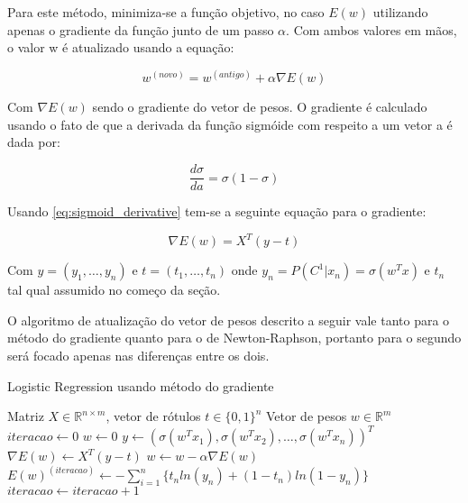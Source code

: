 Para este método, minimiza-se a função objetivo, no caso $E(w)$ utilizando apenas o gradiente
da função junto de um passo $\alpha$. Com ambos valores em mãos, o valor w é atualizado usando
a equação:

\begin{center}
	\begin{equation}
		w^{ ( novo )} = w^{ (antigo) }  + \alpha \nabla E(w)
	\end{equation}
\end{center}

Com $\nabla E(w)$ sendo o gradiente do vetor de pesos. O gradiente é calculado usando o fato de que
a derivada da função sigmóide com respeito a um vetor a é dada por:

\begin{center}
	\begin{equation}
	\label{eq:sigmoid_derivative}
		\frac{d \sigma}{d a} = \sigma (1 - \sigma )
	\end{equation}
\end{center}

Usando \ref{eq:sigmoid_derivative} tem-se a seguinte equação para o gradiente:

\begin{center}
	\begin{equation}\label{eq:gradient}
		\nabla E(w) = X^T(y - t)
	\end{equation}
\end{center}

Com $y = (y_1, \ldots, y_n)$ e $t = (t_1, \ldots, t_n)$ onde
$y_n = P(C^1 | x_n) = \sigma(w^Tx)$ e $t_n$ tal qual assumido no começo da seção.

O algoritmo de atualização do vetor de pesos descrito a seguir vale tanto para o método
do gradiente quanto para o de Newton-Raphson, portanto para o segundo será focado apenas nas
diferenças entre os dois.


\begin{algorithm}[H]
	\caption{Logistic Regression usando método do gradiente}
	\begin{algorithmic}[1]
		\REQUIRE Matriz $ X \in \mathbb{R}^{n \times m} $, 
		vetor de rótulos $t \in \{0, 1\}^n$
		\ENSURE Vetor de pesos $w \in \mathbb{R}^m$
		\STATE $iteracao \leftarrow 0$
		\STATE $w \leftarrow 0$
		 \label{lst:line:condition}
			\STATE $y \leftarrow (\sigma(w^Tx_1), \sigma(w^Tx_2), \ldots, \sigma(w^Tx_n))^T$ 
			\STATE $\nabla E(w) \leftarrow X^T(y - t)$ 
			\STATE $w \leftarrow w - \alpha \nabla E(w)$ 
			\STATE $E(w)^{ (iteracao) } \leftarrow 
			- \sum_{i = 1}^{n} \{ t_nln(y_n) + (1 - t_n) ln(1 - y_n) \}$ 
			\STATE $iteracao \leftarrow iteracao + 1$
		\ENDWHILE
	\end{algorithmic}
\end{algorithm}

